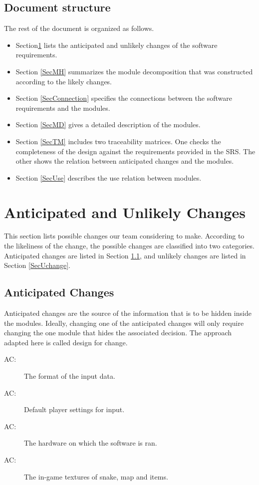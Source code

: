 \documentclass[12pt, titlepage]{article}
\newcounter{acnum}
\newcommand{\actheacnum}{AC\theacnum}
\begin{document}
\subsection{Document structure} \label{SecAchange}
The rest of the document is organized as follows. 
\begin{itemize}
    \item Section\ref{SecChange} lists the anticipated and unlikely changes of the software
requirements.
    \item Section \ref{SecMH} summarizes the module decomposition that
was constructed according to the likely changes. 
    \item Section \ref{SecConnection}
specifies the connections between the software requirements and the
modules. 
    \item Section \ref{SecMD} gives a detailed description of the
modules. 
    \item Section \ref{SecTM} includes two traceability matrices. One checks
the completeness of the design against the requirements provided in the SRS. The
other shows the relation between anticipated changes and the modules. 
    \item Section \ref{SecUse} describes the use relation between modules.
\end{itemize} 


\section{Anticipated and Unlikely Changes} \label{SecChange}

This section lists possible changes our team considering to make. According to the likeliness
of the change, the possible changes are classified into two
categories. Anticipated changes are listed in Section \ref{SecAchange}, and
unlikely changes are listed in Section \ref{SecUchange}.

\subsection{Anticipated Changes} \label{SecAchange}

Anticipated changes are the source of the information that is to be hidden
inside the modules. Ideally, changing one of the anticipated changes will only
require changing the one module that hides the associated decision. The approach
adapted here is called design for
change.

\begin{description}
\item[ \actheacnum \label{acInput}:] The format of the input data.
\item[ \actheacnum \label{acSettings}:] Default player settings for input.
\item[ \actheacnum \label{acHardware}:] The hardware on which the software is ran.
\item[ \actheacnum \label{acTextures}:] The in-game textures of snake, map and items.
\end{description}
\end{document}
